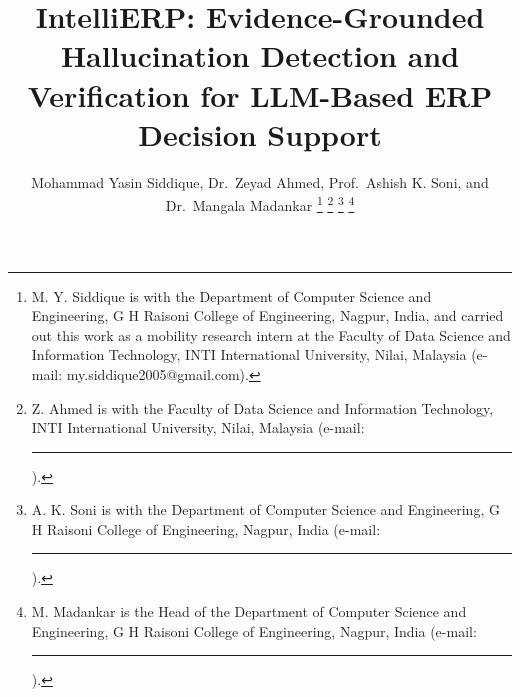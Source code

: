 \documentclass[journal]{IEEEtran}
\begin{document}
\title{IntelliERP: Evidence-Grounded Hallucination Detection and Verification for LLM-Based ERP Decision
Support}
\author{Mohammad Yasin Siddique, Dr.~Zeyad Ahmed, Prof.~Ashish K. Soni, and Dr.~Mangala Madankar%
\thanks{M. Y. Siddique is with the Department of Computer Science and Engineering, G H Raisoni College of
Engineering, Nagpur, India, and carried out this work as a mobility research intern at the Faculty of Data Science
and Information Technology, INTI International University, Nilai, Malaysia (e-mail: my.siddique2005@gmail.com).}%
\thanks{Z. Ahmed is with the Faculty of Data Science and Information Technology, INTI International University,
Nilai, Malaysia (e-mail: \rule{3.2cm}{0.4pt}).}%
\thanks{A. K. Soni is with the Department of Computer Science and Engineering, G H Raisoni College of Engineering,
Nagpur, India (e-mail: \rule{3.2cm}{0.4pt}).}%
\thanks{M. Madankar is the Head of the Department of Computer Science and Engineering, G H Raisoni College of
Engineering, Nagpur, India (e-mail: \rule{3.2cm}{0.4pt}).}}

\maketitle
\end{document}
